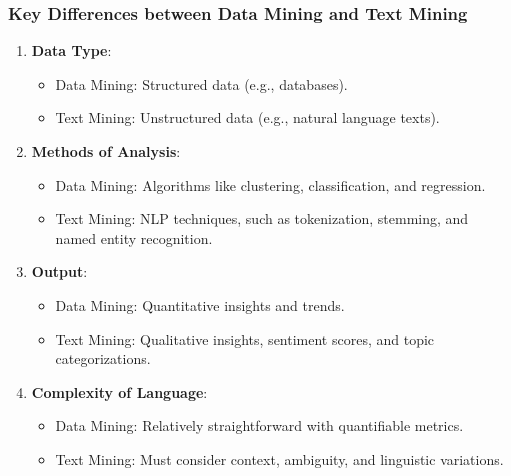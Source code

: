 \documentclass[aspectratio=169]{beamer}
\begin{document}
\begin{frame}[fragile]
    \frametitle{Key Differences between Data Mining and Text Mining}
    \begin{enumerate}
        \item \textbf{Data Type}:
            \begin{itemize}
                \item Data Mining: Structured data (e.g., databases).
                \item Text Mining: Unstructured data (e.g., natural language texts).
            \end{itemize}
        \item \textbf{Methods of Analysis}:
            \begin{itemize}
                \item Data Mining: Algorithms like clustering, classification, and regression.
                \item Text Mining: NLP techniques, such as tokenization, stemming, and named entity recognition.
            \end{itemize}
        \item \textbf{Output}:
            \begin{itemize}
                \item Data Mining: Quantitative insights and trends.
                \item Text Mining: Qualitative insights, sentiment scores, and topic categorizations.
            \end{itemize}
        \item \textbf{Complexity of Language}:
            \begin{itemize}
                \item Data Mining: Relatively straightforward with quantifiable metrics.
                \item Text Mining: Must consider context, ambiguity, and linguistic variations.
            \end{itemize}
    \end{enumerate}
\end{frame}
\end{document}
